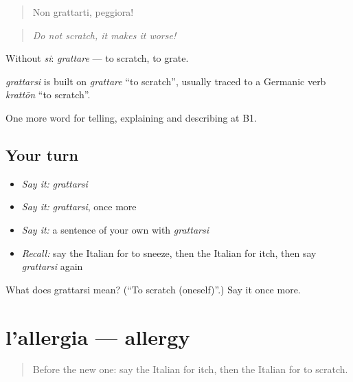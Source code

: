 \begin{quote}
Non grattarti, peggiora!
\end{quote}

\begin{quote}
\emph{Do not scratch, it makes it worse!}
\end{quote}

Without \emph{si}: \emph{grattare} — to scratch, to grate.

\begin{cousinweb}
\emph{grattarsi} is built on \emph{grattare} \textquotedblleft{}to scratch\textquotedblright{}, usually traced to a Germanic verb \emph{krattōn} \textquotedblleft{}to scratch\textquotedblright{}.
\end{cousinweb}

\begin{grammarlens}[title={What you've built}]
One more word for telling, explaining and describing at B1.
\end{grammarlens}

\subsection*{Your turn}
\begin{itemize}
\raggedright
  \item \emph{Say it:} \emph{grattarsi}
  \item \emph{Say it:} \emph{grattarsi}, once more
  \item \emph{Say it:} a sentence of your own with \emph{grattarsi}
  \item \emph{Recall:} say the Italian for to sneeze, then the Italian for itch, then say \emph{grattarsi} again
\end{itemize}

\begin{tcolorbox}[breakable,colback=teal!4,colframe=teal!35!black,title={Before you move on}]
What does grattarsi mean? (\textquotedblleft{}To scratch (oneself)\textquotedblright{}.) Say it once more.
\end{tcolorbox}
\section[l'allergia]{l'allergia — allergy}

\label{lesson:IT-C486-allergia}



\begin{quote}
Before the new one: say the Italian for itch, then the Italian for to scratch.
\end{quote}

